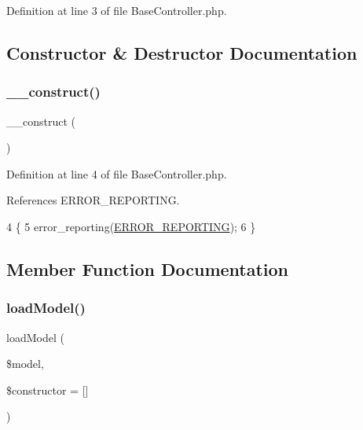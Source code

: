 Definition at line 3 of file Base\+Controller.\+php.



\subsection{Constructor \& Destructor Documentation}
\hypertarget{class_base_controller_a095c5d389db211932136b53f25f39685}{}\label{class_base_controller_a095c5d389db211932136b53f25f39685} 
\subsubsection{\texorpdfstring{\+\_\+\+\_\+construct()}{\_\_construct()}}
{\footnotesize\ttfamily \+\_\+\+\_\+construct (\begin{DoxyParamCaption}{ }\end{DoxyParamCaption})}



Definition at line 4 of file Base\+Controller.\+php.



References E\+R\+R\+O\+R\+\_\+\+R\+E\+P\+O\+R\+T\+I\+NG.


\begin{DoxyCode}
4                                   \{
5         error\_reporting(\hyperlink{config_8php_a80c2f40a4ce1ad3cbfb1978239f63c31}{ERROR\_REPORTING});
6     \}
\end{DoxyCode}


\subsection{Member Function Documentation}
\hypertarget{class_base_controller_a5fa8890bd3a9d20f5c0cc2377dc49eb1}{}\label{class_base_controller_a5fa8890bd3a9d20f5c0cc2377dc49eb1} 
\subsubsection{\texorpdfstring{load\+Model()}{loadModel()}}
{\footnotesize\ttfamily load\+Model (\begin{DoxyParamCaption}\item[{}]{\$model,  }\item[{}]{\$constructor = {\ttfamily \mbox{[}\mbox{]}} }\end{DoxyParamCaption})\hspace{0.3cm}{\ttfamily [protected]}}

